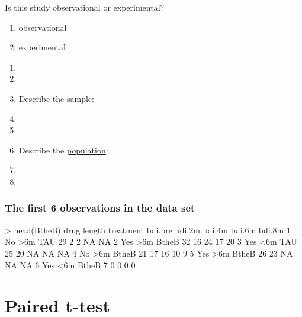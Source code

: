\begin{frame}
\begin{clicker}{Is this study observational or experimental?}
\begin{enumerate}
    \item
    observational
    \item
    experimental
\end{enumerate}
\end{clicker}
\begin{enumerate}
    \item[]
    \item[]
    \item
    Describe the \underline{sample}:
    \item[]
    \item[]
    \item
    Describe the \underline{population}:
    \item[]
    \item[]
\end{enumerate}
\end{frame}

\begin{frame}[fragile]
\frametitle{The first 6 observations in the data set}
\begin{lcverbatim}
> head(BtheB)
  drug length treatment bdi.pre bdi.2m bdi.4m bdi.6m bdi.8m
1   No    >6m       TAU      29      2      2     NA     NA
2  Yes    >6m     BtheB      32     16     24     17     20
3  Yes    <6m       TAU      25     20     NA     NA     NA
4   No    >6m     BtheB      21     17     16     10      9
5  Yes    >6m     BtheB      26     23     NA     NA     NA
6  Yes    <6m     BtheB       7      0      0      0      0
\end{lcverbatim}
\end{frame}


\section[Paired t-test]{Paired t-test}
\begin{frame}
\end{frame}

